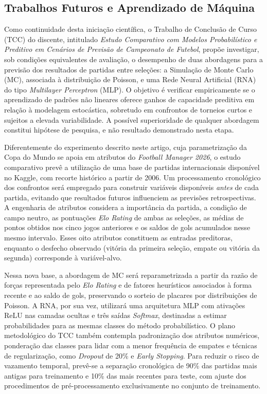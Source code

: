 \documentclass[12pt]{article}
\begin{document}
\subsection{Trabalhos Futuros e Aprendizado de Máquina}

Como continuidade desta iniciação científica, o Trabalho de Conclusão de Curso (TCC) do discente, intitulado \textit{Estudo Comparativo com Modelos Probabilístico e Preditivo em Cenários de Previsão de Campeonato de Futebol}, propõe investigar, sob condições equivalentes de avaliação, o desempenho de duas abordagens para a previsão dos resultados de partidas entre seleções: a Simulação de Monte Carlo (MC), associada à distribuição de Poisson, e uma Rede Neural Artificial (RNA) do tipo \textit{Multilayer Perceptron} (MLP). O objetivo é verificar empiricamente se o aprendizado de padrões não lineares oferece ganhos de capacidade preditiva em relação à modelagem estocástica, sobretudo em confrontos de torneios curtos e sujeitos a elevada variabilidade. A possível superioridade de qualquer abordagem constitui hipótese de pesquisa, e não resultado demonstrado nesta etapa.

Diferentemente do experimento descrito neste artigo, cuja parametrização da Copa do Mundo se apoia em atributos do \textit{Football Manager 2026}, o estudo comparativo prevê a utilização de uma base de partidas internacionais disponível no Kaggle, com recorte histórico a partir de 2006. Um processamento cronológico dos confrontos será empregado para construir variáveis disponíveis \textit{antes} de cada partida, evitando que resultados futuros influenciem as previsões retrospectivas. A engenharia de atributos considera a importância da partida, a condição de campo neutro, as pontuações \textit{Elo Rating} de ambas as seleções, as médias de pontos obtidos nos cinco jogos anteriores e os saldos de gols acumulados nesse mesmo intervalo. Esses oito atributos constituem as entradas preditoras, enquanto o desfecho observado (vitória da primeira seleção, empate ou vitória da segunda) corresponde à variável-alvo.

Nessa nova base, a abordagem de MC será reparametrizada a partir da razão de forças representada pelo \textit{Elo Rating} e de fatores heurísticos associados à forma recente e ao saldo de gols, preservando o sorteio de placares por distribuições de Poisson. A RNA, por sua vez, utilizará uma arquitetura MLP com ativações ReLU nas camadas ocultas e três saídas \textit{Softmax}, destinadas a estimar probabilidades para as mesmas classes do método probabilístico. O plano metodológico do TCC também contempla padronização dos atributos numéricos, ponderação das classes para lidar com a menor frequência de empates e técnicas de regularização, como \textit{Dropout} de 20\% e \textit{Early Stopping}. Para reduzir o risco de vazamento temporal, prevê-se a separação cronológica de 90\% das partidas mais antigas para treinamento e 10\% das mais recentes para teste, com ajuste dos procedimentos de pré-processamento exclusivamente no conjunto de treinamento.
\end{document}
